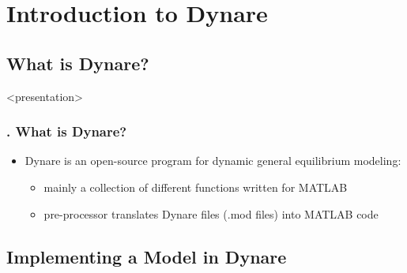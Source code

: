 \documentclass[11pt,aspectratio=169]{beamer}
\begin{document}
\section{Introduction to Dynare}

\subsection{What is Dynare?}
\begin{frame}<presentation>
\frametitle{{\thesection.\thesubsection} What is Dynare?}
  \begin{itemize}
		\item Dynare is an open-source program for dynamic general equilibrium modeling:
		\begin{itemize}
			\item mainly a collection of different functions written for MATLAB
			\item pre-processor translates Dynare files (.mod files) into MATLAB code
		\end{itemize}
	\end{itemize}
\end{frame}

\subsection{Implementing a Model in Dynare}
\end{document}
